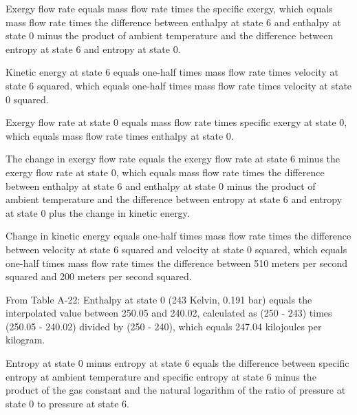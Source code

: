 Exergy flow rate equals mass flow rate times the specific exergy, which equals mass flow rate times the difference between enthalpy at state 6 and enthalpy at state 0 minus the product of ambient temperature and the difference between entropy at state 6 and entropy at state 0.  

Kinetic energy at state 6 equals one-half times mass flow rate times velocity at state 6 squared, which equals one-half times mass flow rate times velocity at state 0 squared.  

Exergy flow rate at state 0 equals mass flow rate times specific exergy at state 0, which equals mass flow rate times enthalpy at state 0.  

The change in exergy flow rate equals the exergy flow rate at state 6 minus the exergy flow rate at state 0, which equals mass flow rate times the difference between enthalpy at state 6 and enthalpy at state 0 minus the product of ambient temperature and the difference between entropy at state 6 and entropy at state 0 plus the change in kinetic energy.  

Change in kinetic energy equals one-half times mass flow rate times the difference between velocity at state 6 squared and velocity at state 0 squared, which equals one-half times mass flow rate times the difference between 510 meters per second squared and 200 meters per second squared.  

From Table A-22:  
Enthalpy at state 0 (243 Kelvin, 0.191 bar) equals the interpolated value between 250.05 and 240.02, calculated as (250 - 243) times (250.05 - 240.02) divided by (250 - 240), which equals 247.04 kilojoules per kilogram.  

Entropy at state 0 minus entropy at state 6 equals the difference between specific entropy at ambient temperature and specific entropy at state 6 minus the product of the gas constant and the natural logarithm of the ratio of pressure at state 0 to pressure at state 6.
